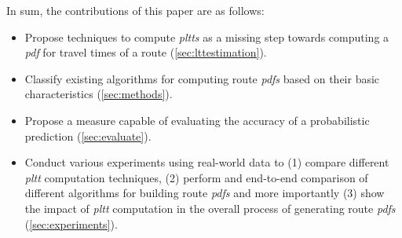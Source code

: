 In sum, the contributions of this paper are as follows:
\begin{itemize}
\item Propose techniques to compute \textit{pltts} as a missing step towards computing a \textit{pdf} for travel times of a route (\cref{sec:lttestimation}).
\item Classify existing algorithms for computing route \textit{pdfs} based on their basic characteristics (\cref{sec:methods}).
\item Propose a measure capable of evaluating the accuracy of a probabilistic prediction (\cref{sec:evaluate}).
\item Conduct various experiments using real-world data to (1) compare different \textit{pltt} computation techniques, (2) perform and end-to-end comparison of different algorithms for building route \textit{pdfs} and more importantly (3) show the impact of \textit{pltt} computation in the overall process of generating route \textit{pdfs} (\cref{sec:experiments}).
\end{itemize} 


